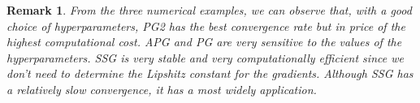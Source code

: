 \documentclass{article}
\numberwithin{equation}{section}
\numberwithin{figure}{section}
\newtheorem{remark}{Remark}[section]
\begin{document}
\begin{remark}
From the three numerical examples, we can observe that, with a good choice of hyperparameters, PG2 has the best convergence rate but in price of the highest computational cost. APG and PG are very sensitive to the values of the hyperparameters. SSG is very stable and very computationally efficient since we don't need to determine the Lipshitz constant for the gradients. Although SSG has a relatively slow convergence, it has a most widely application.

\end{remark}
\end{document}
